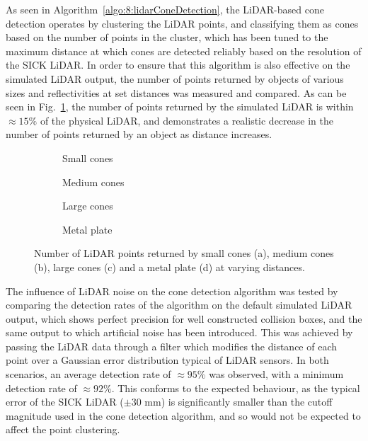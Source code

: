 As seen in Algorithm~\ref{algo:8:lidarConeDetection}, the LiDAR-based cone detection operates by clustering the LiDAR points, and classifying them as cones based on the number of points in the cluster, which has been tuned to the maximum distance at which cones are detected reliably based on the resolution of the SICK LiDAR.
In order to ensure that this algorithm is also effective on the simulated LiDAR output, the number of points returned by objects of various sizes and reflectivities at set distances was measured and compared.
As can be seen in Fig.~\ref{fig:8:lidarPointCounts}, the number of points returned by the simulated LiDAR is within $\approx 15\%$ of the physical LiDAR, and demonstrates a realistic decrease in the number of points returned by an object as distance increases.

\begin{figure}[!ht]
	\centering
	\begin{subfigure}[b]{0.45\textwidth}
		
		\caption{Small cones}  
	\end{subfigure} 
	\hspace{1em}         
	\begin{subfigure}[b]{0.45\textwidth}
		
		\caption{Medium cones}
	\end{subfigure}
	\vspace{1em} 
	\begin{subfigure}[b]{0.45\textwidth}
		
		\caption{Large cones}  
	\end{subfigure} 
	\hspace{1em}         
	\begin{subfigure}[b]{0.45\textwidth}
		
		\caption{Metal plate}
	\end{subfigure}        
	\caption[Number of LiDAR points returned]{Number of LiDAR points returned by small cones (a), medium cones (b), large cones (c) and a metal plate (d) at varying distances.}
	\label{fig:8:lidarPointCounts}
\end{figure}

The influence of LiDAR noise on the cone detection algorithm was tested by comparing the detection rates of the algorithm on the default simulated LiDAR output, which shows perfect precision for well constructed collision boxes, and the same output to which artificial noise has been introduced.
This was achieved by passing the LiDAR data through a filter which modifies the distance of each point over a Gaussian error distribution typical of LiDAR sensors.
In both scenarios, an average detection rate of $\approx 95\%$ was observed, with a minimum detection rate of $\approx 92\%$.
This conforms to the expected behaviour, as the typical error of the SICK LiDAR ($\pm 30$ \si{\milli\meter}) is significantly smaller than the cutoff magnitude used in the cone detection algorithm, and so would not be expected to affect the point clustering.

